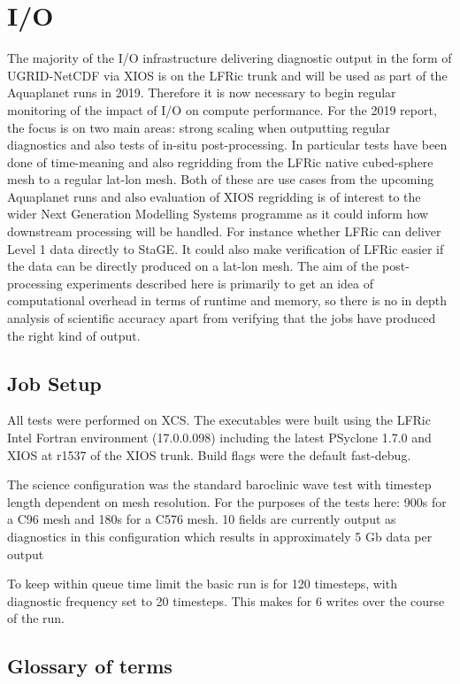 \section{I/O}
The majority of the I/O infrastructure delivering diagnostic output in the form of UGRID-NetCDF via XIOS is on the LFRic trunk
and will be used as part of the Aquaplanet runs in 2019. Therefore it is now necessary to begin regular monitoring of the impact
of I/O on compute performance. For the 2019 report, the focus is on two main areas: strong scaling when outputting regular
diagnostics and also tests of in-situ post-processing. In particular tests have been done of time-meaning and also regridding 
from the LFRic native cubed-sphere mesh to a regular lat-lon mesh. Both of these are use cases from the upcoming Aquaplanet
runs and also evaluation of XIOS regridding is of interest to the wider Next Generation Modelling Systems programme as it
could inform how downstream processing will be handled. For instance whether LFRic can deliver Level 1 data directly to StaGE.
It could also make verification of LFRic easier if the data can be directly produced on a lat-lon mesh. The aim of the post-processing
experiments described here is primarily to get an idea of computational overhead in terms of runtime and memory, 
so there is no in depth analysis of scientific accuracy apart from verifying that the jobs have produced the right kind of output. 

\subsection{Job Setup}
All tests were performed on XCS. The executables were built using the LFRic Intel Fortran environment (17.0.0.098) 
including the latest PSyclone 1.7.0 and XIOS at r1537 of the XIOS trunk. Build flags were the default fast-debug.

The science configuration was the standard baroclinic wave test with timestep length dependent on mesh resolution. 
For the purposes of the tests here: 900s for a C96 mesh and 180s for a C576 mesh.
10 fields are currently output as diagnostics in this configuration which results in approximately 5 Gb data per
output

To keep within queue time limit the basic run is for 120 timesteps, with diagnostic frequency set to 20 timesteps.
This makes for 6 writes over the course of the run.

\subsection{Glossary of terms}

